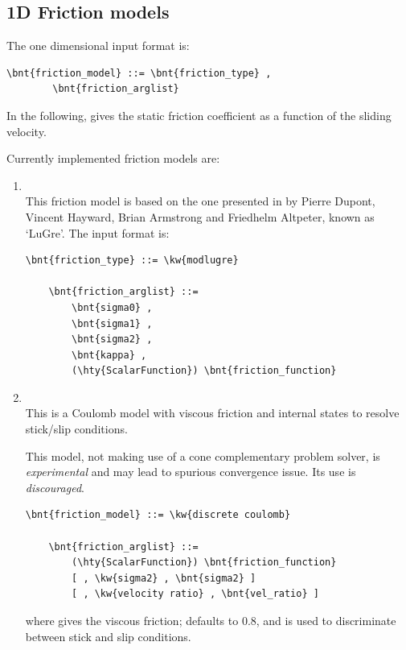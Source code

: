 \subsection{1D Friction models}
\label{sec:friction model 1D}
The one dimensional  input format is:
\begin{Verbatim}[commandchars=\\\{\}]
    \bnt{friction_model} ::= \bnt{friction_type} ,
        \bnt{friction_arglist}
\end{Verbatim}
In the following,  gives the static friction coefficient
as a function of the sliding velocity.

Currently implemented friction models are:
\begin{enumerate}
\item {}\\
This friction model is based on the one presented in \cite{LUGRE-2002}
by Pierre Dupont, Vincent Hayward, Brian Armstrong and Friedhelm Altpeter,
known as `LuGre'.
The input format is:
\begin{Verbatim}[commandchars=\\\{\}]
    \bnt{friction_type} ::= \kw{modlugre}

    \bnt{friction_arglist} ::=
        \bnt{sigma0} ,
        \bnt{sigma1} ,
        \bnt{sigma2} ,
        \bnt{kappa} ,
        (\hty{ScalarFunction}) \bnt{friction_function}
\end{Verbatim}

    \item {}\\
    This is a Coulomb model with viscous friction and
    internal states to resolve stick/slip conditions.

    This model, not making use of a cone complementary problem solver,
    is \emph{experimental} and may lead to spurious convergence issue. Its use is \emph{discouraged}.
\begin{Verbatim}[commandchars=\\\{\}]
    \bnt{friction_model} ::= \kw{discrete coulomb}

    \bnt{friction_arglist} ::=
        (\hty{ScalarFunction}) \bnt{friction_function}
        [ , \kw{sigma2} , \bnt{sigma2} ]
        [ , \kw{velocity ratio} , \bnt{vel_ratio} ]
\end{Verbatim}
    where  gives the viscous friction;
     defaults to 0.8, and is used
    to discriminate between stick and slip conditions.


\end{enumerate}
